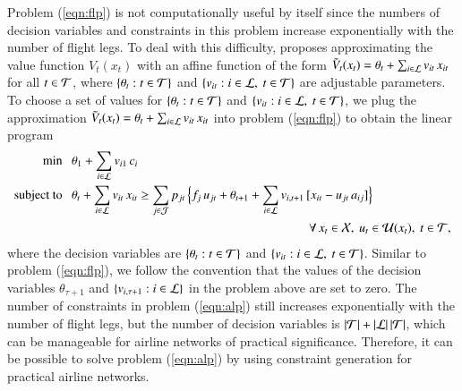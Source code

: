 Problem (\ref{eqn:flp}) is not computationally useful by itself since the numbers of decision variables and constraints in this problem increase exponentially with the number of flight legs. To deal with this difficulty,  proposes approximating the value function $V_t(x_t)$ with an affine function of the form ${\tilde V}_t(x_t) = \theta_t + \sum_{i \in {\cal L}} v_{it} {\,} x_{it}$ for all $t \in {\cal T}$, where $\{ \theta_t : t \in {\cal T}\}$ and $\{ v_{it} : i \in {\cal L},~ t \in {\cal T}\}$ are adjustable parameters. To choose a set of values for $\{ \theta_t : t \in {\cal T}\}$ and $\{ v_{it} : i \in {\cal L},~ t \in {\cal T}\}$, we plug the approximation ${\tilde V}_t(x_t) = \theta_t + \sum_{i \in {\cal L}} v_{it} {\,} x_{it}$ into problem (\ref{eqn:flp}) to obtain the linear program
%
%
\begin{subequations}
\label{eqn:alp}
\begin{align}
\min ~~~ & \theta_1 + \sum_{i \in {\cal L}} v_{i1} {\,} c_i
\label{eqn:alp_obj}
\\
\mbox{subject to}~~~ & \theta_t + \sum_{i \in {\cal L}} v_{it} {\,} x_{it}  \geq \sum_{j \in {\cal J}} p_{jt} {\,} \Big\{ f_j  {\,} u_{jt} + \theta_{t+1} + \sum_{i \in {\cal L}} v_{i,t+1} {\,} [ x_{it} - \textstyle u_{jt} {\,} a_{ij} ] \Big\} 
\nonumber
\\
&
\quad \qquad \qquad \qquad \qquad \qquad \qquad \qquad \qquad \qquad
\forall {\,} x_t \in {\cal X},~ u_t \in {\cal U}(x_t),~ t \in {\cal T},
\label{eqn:alp_e}
\end{align}
\end{subequations}
%
%
where the decision variables are $\{ \theta_t : t \in {\cal T}\}$ and $\{ v_{it} : i \in {\cal L},~ t \in {\cal T}\}$. Similar to problem (\ref{eqn:flp}), we follow the convention that the values of the decision variables $\theta_{\tau+1}$ and $\{ v_{i,\tau+1} : i \in {\cal L}\}$ in the problem above are set to zero. The number of constraints in problem (\ref{eqn:alp}) still increases exponentially with the number of flight legs, but the number of decision variables is $|{\cal T}| + |{\cal L}| {\,} |{\cal T}|$, which can be manageable for airline networks of practical significance. Therefore, it can be possible to solve problem (\ref{eqn:alp}) by using constraint generation for practical airline networks.


